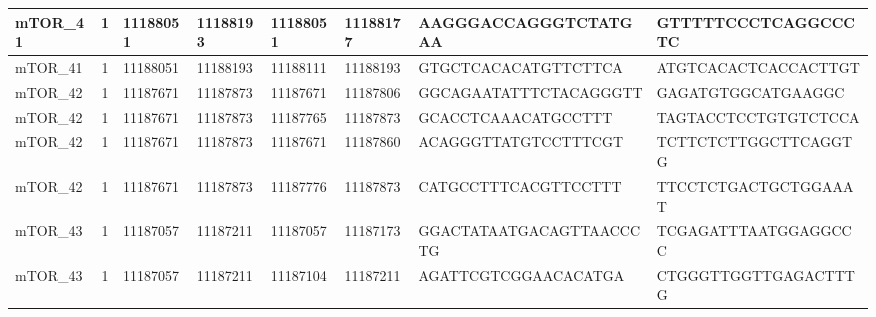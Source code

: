 \begin{landscape}
\begin{longtable}{| p{} | p{} | p{} | p{} | p{} | p{} | p{} | p{} |}
\multicolumn{1}{|l|}{mTOR\_41}   & \multicolumn{1}{c|}{1}  & \multicolumn{1}{l|}{11188051}  & \multicolumn{1}{l|}{11188193}  & \multicolumn{1}{l|}{11188051}  & \multicolumn{1}{l|}{11188177}  & \multicolumn{1}{l|}{AAGGGACCAGGGTCTATGAA}            & \multicolumn{1}{l|}{GTTTTTCCCTCAGGCCCTC}           \\ \hline
\multicolumn{1}{|l|}{mTOR\_41}   & \multicolumn{1}{c|}{1}  & \multicolumn{1}{l|}{11188051}  & \multicolumn{1}{l|}{11188193}  & \multicolumn{1}{l|}{11188111}  & \multicolumn{1}{l|}{11188193}  & \multicolumn{1}{l|}{GTGCTCACACATGTTCTTCA}            & \multicolumn{1}{l|}{ATGTCACACTCACCACTTGT}          \\ \hline
\multicolumn{1}{|l|}{mTOR\_42}   & \multicolumn{1}{c|}{1}  & \multicolumn{1}{l|}{11187671}  & \multicolumn{1}{l|}{11187873}  & \multicolumn{1}{l|}{11187671}  & \multicolumn{1}{l|}{11187806}  & \multicolumn{1}{l|}{GGCAGAATATTTCTACAGGGTT}          & \multicolumn{1}{l|}{GAGATGTGGCATGAAGGC}            \\ \hline
\multicolumn{1}{|l|}{mTOR\_42}   & \multicolumn{1}{c|}{1}  & \multicolumn{1}{l|}{11187671}  & \multicolumn{1}{l|}{11187873}  & \multicolumn{1}{l|}{11187765}  & \multicolumn{1}{l|}{11187873}  & \multicolumn{1}{l|}{GCACCTCAAACATGCCTTT}             & \multicolumn{1}{l|}{TAGTACCTCCTGTGTCTCCA}          \\ \hline
\multicolumn{1}{|l|}{mTOR\_42}   & \multicolumn{1}{c|}{1}  & \multicolumn{1}{l|}{11187671}  & \multicolumn{1}{l|}{11187873}  & \multicolumn{1}{l|}{11187671}  & \multicolumn{1}{l|}{11187860}  & \multicolumn{1}{l|}{ACAGGGTTATGTCCTTTCGT}            & \multicolumn{1}{l|}{TCTTCTCTTGGCTTCAGGTG}          \\ \hline
\multicolumn{1}{|l|}{mTOR\_42}   & \multicolumn{1}{c|}{1}  & \multicolumn{1}{l|}{11187671}  & \multicolumn{1}{l|}{11187873}  & \multicolumn{1}{l|}{11187776}  & \multicolumn{1}{l|}{11187873}  & \multicolumn{1}{l|}{CATGCCTTTCACGTTCCTTT}            & \multicolumn{1}{l|}{TTCCTCTGACTGCTGGAAAT}          \\ \hline
\multicolumn{1}{|l|}{mTOR\_43}   & \multicolumn{1}{c|}{1}  & \multicolumn{1}{l|}{11187057}  & \multicolumn{1}{l|}{11187211}  & \multicolumn{1}{l|}{11187057}  & \multicolumn{1}{l|}{11187173}  & \multicolumn{1}{l|}{GGACTATAATGACAGTTAACCCTG}        & \multicolumn{1}{l|}{TCGAGATTTAATGGAGGCCC}          \\ \hline
\multicolumn{1}{|l|}{mTOR\_43}   & \multicolumn{1}{c|}{1}  & \multicolumn{1}{l|}{11187057}  & \multicolumn{1}{l|}{11187211}  & \multicolumn{1}{l|}{11187104}  & \multicolumn{1}{l|}{11187211}  & \multicolumn{1}{l|}{AGATTCGTCGGAACACATGA}            & \multicolumn{1}{l|}{CTGGGTTGGTTGAGACTTTG}          \\ \hline

\end{longtable}
\end{landscape}
